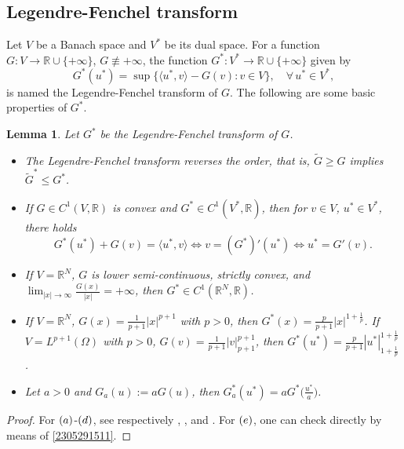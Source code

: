\documentclass[10pt]{article}
\numberwithin{equation}{section}
\newtheorem{lemma}[theorem]{Lemma}
\numberwithin{equation}{section}
\begin{document}
\subsection{Legendre-Fenchel transform}
Let $V$ be a Banach space and $V^*$ be its dual space. For a function $G: V\to \mathbb{R}\cup \{+\infty\}$, $G\not\equiv +\infty$, the function $G^*: V^*\to \mathbb{R}\cup \{+\infty\}$ given by
\begin{equation}\label{2305291511}
G^*(u^*)=\sup\{\langle u^*, v \rangle-G(v): v\in V\},\quad \forall\, u^*\in V^*,
\end{equation}
is named the Legendre-Fenchel transform of $G$. The following are some basic properties of $G^*$.
\begin{lemma}\label{2302252143}
Let $G^*$ be the Legendre-Fenchel transform of $G$.
\begin{itemize}
\item[\rm (a)] The Legendre-Fenchel transform reverses the order, that is, $\widetilde{G}\ge G$ implies $\widetilde{G}^*\le G^*$.
\item[\rm (b)] If $G\in C^1(V, \mathbb{R})$ is convex and $G^*\in C^1(V^*, \mathbb{R})$, then for $v\in V$, $u^*\in V^*$, there holds
\[
G^*(u^*)+G(v)=\langle u^*, v\rangle \iff v=(G^*)'(u^*) \iff u^*=G'(v).
\]
\item[\rm (c)] If $V=\mathbb{R}^N$, $G$ is lower semi-continuous, strictly convex, and $\lim_{|x|\to \infty}\frac{G(x)}{|x|}=+\infty$, then $G^*\in C^1(\mathbb{R}^N, \mathbb{R})$.
\item[\rm (d)] If $V=\mathbb{R}^N$, $G(x)=\frac1{p+1}|x|^{p+1}$ with $p>0$, then  $G^*(x)=\frac{p}{p+1} |x|^{1+\frac1p}$. If $V=L^{p+1}(\Omega)$ with $p>0$, $G(v)=\frac{1}{p+1}|v|_{p+1}^{p+1}$, then $G^*(u^*)=\frac{p}{p+1} |u^*|^{1+\frac1p}_{1+\frac1p}$.
\item[\rm (e)] Let $a>0$ and $G_a(u):=aG(u)$, then
$G^*_a(u^*)=aG^*\big(\frac{u^*}{a}\big)$.
\end{itemize}
\end{lemma}
\begin{proof}
For ${\rm (a)}$-${\rm (d)}$, see respectively \cite[Chapter I, Section 6.2]{Struwe2008}, \cite[Chapter I, Lemma 6.3]{Struwe2008}, \cite[Proposition 2.4]{MW1989} and \cite[Proposition 4.2, Remark 4.1]{ET1999}. For ${\rm (e)}$, one can check directly by means of \eqref{2305291511}.
\end{proof}
\end{document}
